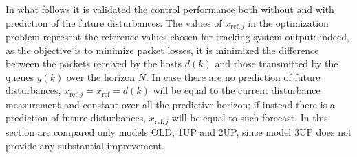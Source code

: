 In what follows it is validated the control performance both without and with prediction of the future disturbances. The values of $x_{\mathrm{ref},j}$ in the optimization problem represent the reference values chosen for tracking system output: indeed, as the objective is to minimize packet losses, it is minimized the difference between the packets received by the hosts $d(k)$ and those transmitted by the queues $y(k)$ over the horizon $N$. In case there are no prediction of future disturbances, $x_{\mathrm{ref},j}=x_{\mathrm{ref}}=d(k)$ will be equal to the current disturbance  measurement and constant over all the predictive horizon; if instead there is a prediction of future disturbances, $x_{\mathrm{ref},j}$ will be equal to such forecast. In this section are compared only models OLD, 1UP and 2UP, since model 3UP does not provide any substantial improvement. 

